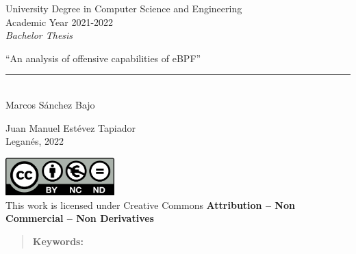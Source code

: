 \documentclass[12pt]{report} %
\begin{document}
	
\begin{titlepage}
	\begin{sffamily}
	\color{azulUC3M}
	\begin{center}
		\begin{figure}[H] %
		\end{figure}
		\vspace{2.5cm}
		\begin{Large}
			University Degree in Computer Science and Engineering\\			
			Academic Year 2021-2022\\
			\vspace{2cm}		
			\textsl{Bachelor Thesis}
			\bigskip
			
		\end{Large}
		 	{\Huge ``An analysis of offensive capabilities of eBPF''}\\
		 	\vspace*{0.5cm}
	 		\rule{10.5cm}{0.1mm}\\
			\vspace*{0.9cm}
			{\LARGE Marcos Sánchez Bajo}\\ 
			\vspace*{1cm}
		\begin{Large}
			Juan Manuel Estévez Tapiador\\
			Leganés, 2022\\
		\end{Large}
	\end{center}
	\vfill
	\color{black}
	\includegraphics[width=4.2cm]{images/creativecommons.png}\\  
	This work is licensed under Creative Commons \textbf{Attribution – Non Commercial – Non Derivatives}
	\end{sffamily}
\end{titlepage}

\newpage
\thispagestyle{empty}
\mbox{}

\renewcommand\abstractname{\large\uppercase{Summary}}
\begin{abstract}
\thispagestyle{plain}
\setcounter{page}{3}
	
	
	\textbf{Keywords:}
	
	\vfill
\end{abstract}
	\newpage
	\thispagestyle{empty}
	\mbox{}
\end{document}
